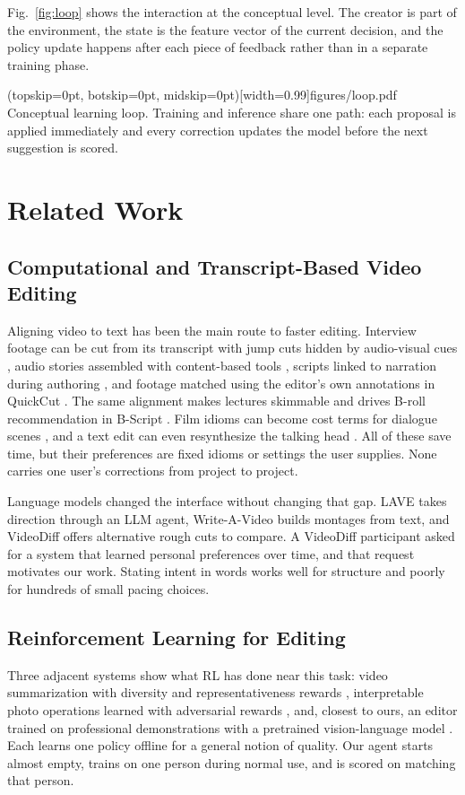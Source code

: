 \documentclass{ieeeaccess}
\begin{document}
Fig.~\ref{fig:loop} shows the interaction at the conceptual level. The creator is part of the environment, the state is the feature vector of the current decision, and the policy update happens after each piece of feedback rather than in a separate training phase.

\Figure[t!](topskip=0pt, botskip=0pt, midskip=0pt)[width=0.99\columnwidth]{figures/loop.pdf}
{Conceptual learning loop. Training and inference share one path: each proposal is applied immediately and every correction updates the model before the next suggestion is scored.\label{fig:loop}}

\section{Related Work}
\label{sec:related}

\subsection{Computational and Transcript-Based Video Editing}
Aligning video to text has been the main route to faster editing. Interview footage can be cut from its transcript with jump cuts hidden by audio-visual cues \cite{berthouzoz2012}, audio stories assembled with content-based tools \cite{rubin2013}, scripts linked to narration during authoring \cite{shin2016}, and footage matched using the editor's own annotations in QuickCut \cite{truong2016}. The same alignment makes lectures skimmable \cite{pavel2014} and drives B-roll recommendation in B-Script \cite{huber2019}. Film idioms can become cost terms for dialogue scenes \cite{leake2017}, and a text edit can even resynthesize the talking head \cite{fried2019}. All of these save time, but their preferences are fixed idioms or settings the user supplies. None carries one user's corrections from project to project.

Language models changed the interface without changing that gap. LAVE \cite{wang2024lave} takes direction through an LLM agent, Write-A-Video \cite{wang2019write} builds montages from text, and VideoDiff \cite{huh2025videodiff} offers alternative rough cuts to compare. A VideoDiff participant asked for a system that learned personal preferences over time, and that request motivates our work. Stating intent in words works well for structure and poorly for hundreds of small pacing choices.

\subsection{Reinforcement Learning for Editing}
Three adjacent systems show what RL has done near this task: video summarization with diversity and representativeness rewards \cite{zhou2018summarization}, interpretable photo operations learned with adversarial rewards \cite{hu2018exposure}, and, closest to ours, an editor trained on professional demonstrations with a pretrained vision-language model \cite{hu2023rlediting}. Each learns one policy offline for a general notion of quality. Our agent starts almost empty, trains on one person during normal use, and is scored on matching that person.
\end{document}
